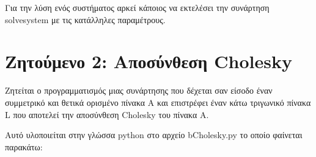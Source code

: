 \documentclass[a4paper,11pt]{article}
\newcommand{\lt}{\latintext}
\newcommand{\gt}{\greektext}
\begin{document}
\par
Για την λύση ενός συστήματος αρκεί κάποιος να εκτελέσει την συνάρτηση {\lt solve\textunderscore system} με τις κατάλληλες παραμέτρους.

\section*{Ζητούμενο 2: Αποσύνθεση {\lt Cholesky}}
Ζητείται ο προγραμματισμός μιας συνάρτησης που δέχεται σαν είσοδο έναν συμμετρικό και θετικά ορισμένο πίνακα A και επιστρέφει έναν κάτω τριγωνικό πίνακα {\lt L} που αποτελεί την αποσύνθεση {\lt Cholesky} του πίνακα A.

Αυτό υλοποιείται στην γλώσσα {\lt python} στο αρχείο {\lt b\textunderscore Cholesky.py} το οποίο φαίνεται παρακάτω:

\lt

\gt
\end{document}
